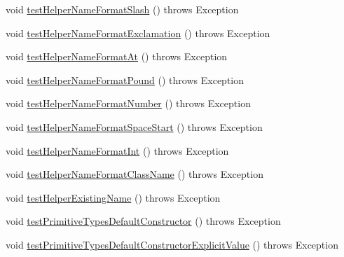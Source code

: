 \begin{DoxyCompactItemize}
\item 
void \hyperlink{classedu_1_1illinois_1_1canistelCassabanana_1_1tests_1_1RemoveDuplicateCodeInConstructorsRefactoringTests_aa04dfc19bebd404da45251c3c8b1f0de}{testHelperNameFormatSlash} ()  throws Exception 
\item 
void \hyperlink{classedu_1_1illinois_1_1canistelCassabanana_1_1tests_1_1RemoveDuplicateCodeInConstructorsRefactoringTests_a0acf0dabdaf864b9f9faec0e8995bbb8}{testHelperNameFormatExclamation} ()  throws Exception 
\item 
void \hyperlink{classedu_1_1illinois_1_1canistelCassabanana_1_1tests_1_1RemoveDuplicateCodeInConstructorsRefactoringTests_a3991e884cd369ec29b6de430efc0eabe}{testHelperNameFormatAt} ()  throws Exception 
\item 
void \hyperlink{classedu_1_1illinois_1_1canistelCassabanana_1_1tests_1_1RemoveDuplicateCodeInConstructorsRefactoringTests_a942b77b44b79b85c4eb860eed48d9136}{testHelperNameFormatPound} ()  throws Exception 
\item 
void \hyperlink{classedu_1_1illinois_1_1canistelCassabanana_1_1tests_1_1RemoveDuplicateCodeInConstructorsRefactoringTests_aecbc89b5257d174bdc5bb213ade69926}{testHelperNameFormatNumber} ()  throws Exception 
\item 
void \hyperlink{classedu_1_1illinois_1_1canistelCassabanana_1_1tests_1_1RemoveDuplicateCodeInConstructorsRefactoringTests_ad4974ee7f3f0c5ecb12191aec0c2a8da}{testHelperNameFormatSpaceStart} ()  throws Exception 
\item 
void \hyperlink{classedu_1_1illinois_1_1canistelCassabanana_1_1tests_1_1RemoveDuplicateCodeInConstructorsRefactoringTests_a88e5176a08cbc4753b183ae00a5114ac}{testHelperNameFormatInt} ()  throws Exception 
\item 
void \hyperlink{classedu_1_1illinois_1_1canistelCassabanana_1_1tests_1_1RemoveDuplicateCodeInConstructorsRefactoringTests_ac8664dd434e6bbe2fdbfb74e75d9857b}{testHelperNameFormatClassName} ()  throws Exception 
\item 
void \hyperlink{classedu_1_1illinois_1_1canistelCassabanana_1_1tests_1_1RemoveDuplicateCodeInConstructorsRefactoringTests_a7cd315b251e2bb907f9b603c35178cd1}{testHelperExistingName} ()  throws Exception 
\item 
void \hyperlink{classedu_1_1illinois_1_1canistelCassabanana_1_1tests_1_1RemoveDuplicateCodeInConstructorsRefactoringTests_ab15dc29ef881c83085f3eb1011efc266}{testPrimitiveTypesDefaultConstructor} ()  throws Exception 
\item 
void \hyperlink{classedu_1_1illinois_1_1canistelCassabanana_1_1tests_1_1RemoveDuplicateCodeInConstructorsRefactoringTests_ad2d10c04ff25aeecd02e6dc405d157f2}{testPrimitiveTypesDefaultConstructorExplicitValue} ()  throws Exception 

\end{DoxyCompactItemize}
